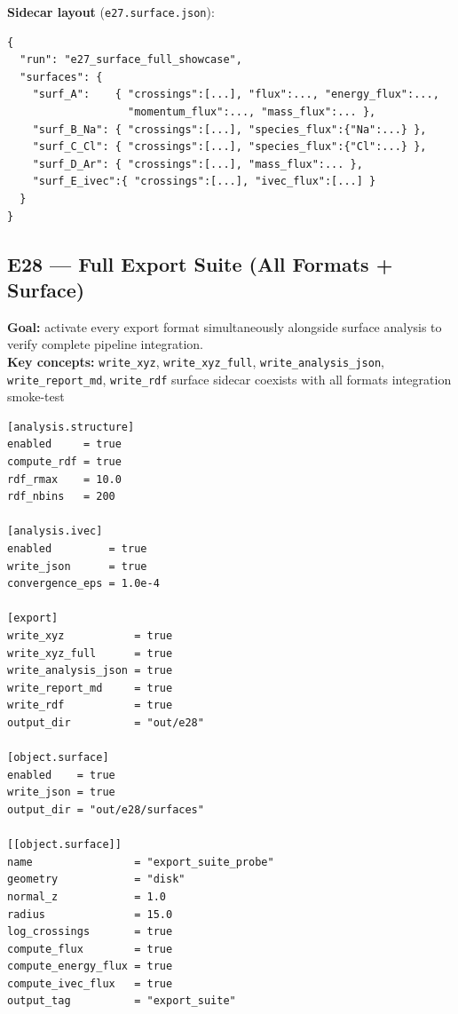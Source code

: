 \documentclass[11pt,a4paper]{article}
\begin{document}
\textbf{Sidecar layout} (\texttt{e27.surface.json}):

\begin{tcolorbox}[enhanced, breakable,
  colback=vsimcodebg, colframe=vsimrule, arc=3pt, boxrule=0.6pt,
  left=4pt, right=4pt, top=3pt, bottom=3pt]
\begin{lstlisting}[style=jsonlst]
{
  "run": "e27_surface_full_showcase",
  "surfaces": {
    "surf_A":    { "crossings":[...], "flux":..., "energy_flux":...,
                   "momentum_flux":..., "mass_flux":... },
    "surf_B_Na": { "crossings":[...], "species_flux":{"Na":...} },
    "surf_C_Cl": { "crossings":[...], "species_flux":{"Cl":...} },
    "surf_D_Ar": { "crossings":[...], "mass_flux":... },
    "surf_E_ivec":{ "crossings":[...], "ivec_flux":[...] }
  }
}
\end{lstlisting}
\end{tcolorbox}

\subsection*{E28 --- Full Export Suite (All Formats + Surface)}

\textbf{Goal:} activate every export format simultaneously alongside surface
analysis to verify complete pipeline integration.\\
\textbf{Key concepts:} \texttt{write\_xyz}, \texttt{write\_xyz\_full},
\texttt{write\_analysis\_json}, \texttt{write\_report\_md}, \texttt{write\_rdf}
\textbullet{} surface sidecar coexists with all formats
\textbullet{} integration smoke-test

\begin{tcolorbox}[scriptbox, scriptheader,
  title={scripts/e28\_surface\_export\_suite.vsim (excerpt)}]
\begin{lstlisting}[style=vsimlst]
[analysis.structure]
enabled     = true
compute_rdf = true
rdf_rmax    = 10.0
rdf_nbins   = 200

[analysis.ivec]
enabled         = true
write_json      = true
convergence_eps = 1.0e-4

[export]
write_xyz           = true
write_xyz_full      = true
write_analysis_json = true
write_report_md     = true
write_rdf           = true
output_dir          = "out/e28"

[object.surface]
enabled    = true
write_json = true
output_dir = "out/e28/surfaces"

[[object.surface]]
name                = "export_suite_probe"
geometry            = "disk"
normal_z            = 1.0
radius              = 15.0
log_crossings       = true
compute_flux        = true
compute_energy_flux = true
compute_ivec_flux   = true
output_tag          = "export_suite"
\end{lstlisting}
\end{tcolorbox}
\end{document}
